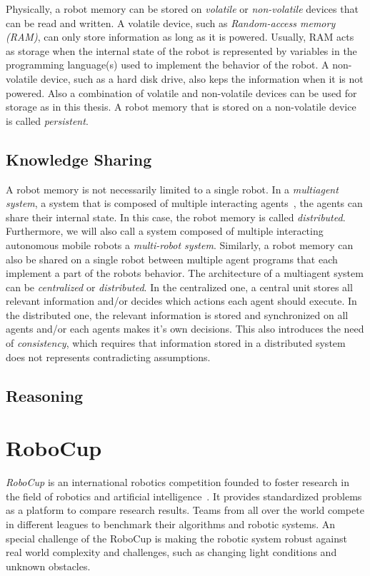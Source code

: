 Physically, a robot memory can be stored on \emph{volatile} or
\emph{non-volatile} devices that can be read and written. A volatile
device, such as \emph{Random-access memory (RAM)}, can only store
information as long as it is powered. Usually, RAM acts as storage
when the internal state of the robot is represented by variables in
the programming language(s) used to implement the behavior of the
robot.  A non-volatile device, such as a hard disk drive, also keps
the information when it is not powered. Also a combination of volatile
and non-volatile devices can be used for storage as in this thesis. A
robot memory that is stored on a non-volatile device is called
\emph{persistent}.

\subsection{Knowledge Sharing}
\label{sec:knowledge-sharing}
A robot memory is not necessarily limited to a single robot. In a
\emph{multiagent system}, a system that is composed of multiple
interacting agents~\cite{multiagentsystems}, the agents can share
their internal state. In this case, the robot memory is called
\emph{distributed}. Furthermore, we will also call a system composed
of multiple interacting autonomous mobile robots a \emph{multi-robot
  system}. Similarly, a robot memory can also be shared on a single
robot between multiple agent programs that each implement a part of
the robots behavior. The architecture of a multiagent system can be
\emph{centralized} or \emph{distributed}. In the centralized one,
a central unit stores all relevant information and/or decides which
actions each agent should execute. In the distributed one, the
relevant information is stored and synchronized on all agents and/or
each agents makes it's own decisions. This also introduces the need of
\emph{consistency}, which requires that information stored in a
distributed system does not represents contradicting assumptions.

\subsection{Reasoning}
\label{sec:reasoning}

\section{RoboCup}
\label{sec:robocup}
\emph{RoboCup} is an international robotics competition founded to
foster research in the field of robotics and artificial
intelligence~\cite{RoboCup-Paper}. It provides standardized problems
as a platform to compare research results. Teams from all over the
world compete in different leagues to benchmark their algorithms and
robotic systems. An special challenge of the RoboCup is making the
robotic system robust against real world complexity and challenges,
such as changing light conditions and unknown obstacles.

